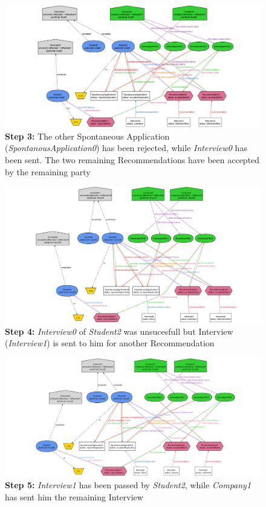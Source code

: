 \begin{figure}[H]
    \hspace{-2.5cm}
    \includegraphics[width=1.3\linewidth]{Latex/Images/Alloy/3.png}
    \caption*{\textbf{Step 3:} The other Spontaneous Application (\textit{SpontanousApplication0}) has been rejected, while \textit{Interview0} has been sent. The two remaining Recommendations have been accepted by the remaining party}
    \label{fig:ALIMG3}
\end{figure}
\begin{figure}[H]
    \hspace{-2.5cm}
    \includegraphics[width=1.3\linewidth]{Latex/Images/Alloy/4.png}
    \caption*{\textbf{Step 4:} \textit{Interview0} of \textit{Student2} was unsucesfull but Interview (\textit{Interview1}) is sent to him for another Recommendation}
    \label{fig:ALIMG4}
\end{figure}
\begin{figure}[H]
    \hspace{-2.5cm}
    \includegraphics[width=1.3\linewidth]{Latex/Images/Alloy/5.png}
    \caption*{\textbf{Step 5:} \textit{Interview1} has been passed by \textit{Student2}, while \textit{Company1} has sent him the remaining Interview}
    \label{fig:ALIMG5}
\end{figure}



